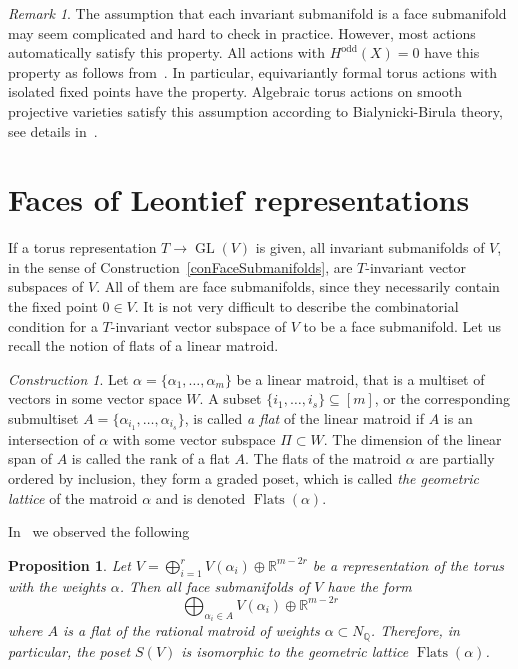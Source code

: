 \documentclass[english,12pt,oneside]{amsproc}
\DeclareMathOperator{\GL}{GL}
\DeclareMathOperator{\odd}{odd}
\DeclareMathOperator{\Flats}{Flats}
\newcommand{\Ro}{\mathbb{R}}
\newcommand{\Qo}{\mathbb{Q}}
\newcommand{\Nq}{N_\Qo}
\newcounter{stmcounter}[section]
\numberwithin{equation}{section}
\theoremstyle{plain}
\newtheorem{prop}[stmcounter]{Proposition}
\theoremstyle{definition}
\theoremstyle{remark}
\newtheorem{rem}[stmcounter]{Remark}
\newtheorem{con}[stmcounter]{Construction}
\begin{document}
\begin{rem}
The assumption that each invariant submanifold is a face submanifold may seem complicated and hard to check in practice. However, most actions automatically satisfy this property. All actions with $H^{\odd}(X)=0$ have this property as follows from~\cite[Lm.2.2]{MasPan}. In particular, equivariantly formal torus actions with isolated fixed points have the property. Algebraic torus actions on smooth projective varieties satisfy this assumption according to Bialynicki-Birula theory, see details in~\cite{AyzCompl}.
\end{rem}



\section{Faces of Leontief representations}\label{secLowerFaces}

If a torus representation $T\to\GL(V)$ is given, all invariant submanifolds of $V$, in the sense of Construction~\ref{conFaceSubmanifolds}, are $T$-invariant vector subspaces of $V$. All of them are face submanifolds, since they necessarily contain the fixed point $0\in V$. It is not very difficult to describe the combinatorial condition for a $T$-invariant vector subspace of $V$ to be a face submanifold. Let us recall the notion of flats of a linear matroid.

\begin{con}
Let $\alpha=\{\alpha_1,\ldots,\alpha_m\}$ be a linear matroid, that is a multiset of vectors in some vector space $W$. A subset $\{i_1,\ldots,i_s\}\subseteq[m]$, or the corresponding submultiset $A=\{\alpha_{i_1},\ldots,\alpha_{i_s}\}$, is called \emph{a flat} of the linear matroid if $A$ is an intersection of $\alpha$ with some vector subspace $\Pi\subset W$. The dimension of the linear span of $A$ is called the rank of a flat $A$. The flats of the matroid $\alpha$ are partially ordered by inclusion, they form a graded poset, which is called \emph{the geometric lattice} of the matroid $\alpha$ and is denoted $\Flats(\alpha)$.
\end{con}

In~\cite{AyzCherep} we observed the following

\begin{prop}
Let $V=\bigoplus_{i=1}^rV(\alpha_i)\oplus\Ro^{m-2r}$ be a representation of the torus with the weights $\alpha$. Then all face submanifolds of $V$ have the form
\[
\bigoplus_{\alpha_i\in A}V(\alpha_i)\oplus\Ro^{m-2r}
\]
where $A$ is a flat of the rational matroid of weights $\alpha\subset\Nq$. Therefore, in particular, the poset $S(V)$ is isomorphic to the geometric lattice $\Flats(\alpha)$.
\end{prop}
\end{document}
